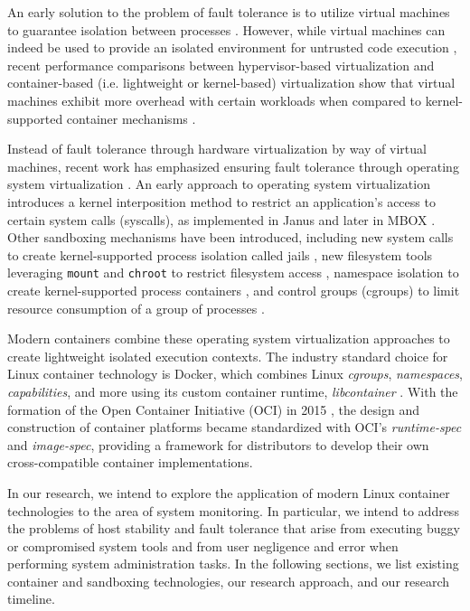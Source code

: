 \documentclass{proc}
\begin{document}
An early solution to the problem of fault tolerance is to utilize virtual machines to guarantee isolation between processes \cite{garfinkel2003terra}. However, while virtual machines can indeed be used to provide an isolated environment for untrusted code execution \cite{wen2012virtualization}, recent performance comparisons between hypervisor-based virtualization and container-based (i.e. lightweight or kernel-based) virtualization show that virtual machines exhibit more overhead with certain workloads when compared to kernel-supported container mechanisms \cite{felter2014docker, morabito2015hypervisors}.

Instead of fault tolerance through hardware virtualization by way of virtual machines, recent work has emphasized ensuring fault tolerance through operating system virtualization \cite{soltesz2007container}. An early approach to operating system virtualization introduces a kernel interposition method to restrict an application's access to certain system calls (syscalls), as implemented in Janus \cite{goldberg1996janus} and later in MBOX \cite{kim2013mbox}. Other sandboxing mechanisms have been introduced, including new system calls to create kernel-supported process isolation called jails \cite{kamp2000jails}, new filesystem tools leveraging \texttt{mount} and \texttt{chroot} to restrict filesystem access \cite{prevelakis2001fmac}, namespace isolation to create kernel-supported process containers \cite{biederman2006namespaces, menage2007containers}, and control groups (cgroups) to limit resource consumption of a group of processes \cite{menagecgroups}.

Modern containers combine these operating system virtualization approaches to create lightweight isolated execution contexts. The industry standard choice for Linux container technology is Docker, which combines Linux \textit{cgroups}, \textit{namespaces}, \textit{capabilities}, and more using its custom container runtime, \textit{libcontainer} \cite{hykes2014libcontainer}. With the formation of the Open Container Initiative (OCI) in 2015 \cite{opencontainerinitiative}, the design and construction of container platforms became standardized with OCI's \textit{runtime-spec} and \textit{image-spec}, providing a framework for distributors to develop their own cross-compatible container implementations.

In our research, we intend to explore the application of modern Linux container technologies to the area of system monitoring. In particular, we intend to address the problems of host stability and fault tolerance that arise from executing buggy or compromised system tools and from user negligence and error when performing system administration tasks. In the following sections, we list existing container and sandboxing technologies, our research approach, and our research timeline.
\end{document}
